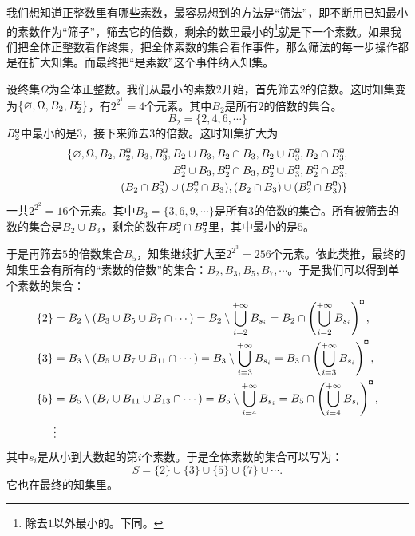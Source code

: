 \documentclass[12pt,UTF8,fontset=none]{ctexbook}
\begin{document}
\begin{ex}
    我们想知道正整数里有哪些素数，最容易想到的方法是“筛法”，即不断用已知最小的素数作为“筛子”，筛去它的倍数，剩余的数里最小的\footnote{除去$1$以外最小的。下同。}就是下一个素数。如果我们把全体正整数看作终集，把全体素数的集合看作事件，那么筛法的每一步操作都是在扩大知集。而最终把“是素数”这个事件纳入知集。

    设终集$\Omega$为全体正整数。我们从最小的素数$2$开始，首先筛去$2$的倍数。这时知集变为$\{\varnothing, \Omega, B_2, B_2^{\bu}\}$，有$2^{2^1} = 4$个元素。其中$B_2$是所有$2$的倍数的集合。
    $$B_2 = \{2,4,6,\cdots\}$$
    $B_2^{\bu}$中最小的是$3$，接下来筛去$3$的倍数。这时知集扩大为
    \begin{align*}
        \{\varnothing, \Omega, B_2, B_2^{\bu}, B_3, B_3^{\bu}, B_2\cup B_3, B_2\cap B_3, B_2\cup B_3^{\bu}, B_2\cap B_3^{\bu},\\
        B_2^{\bu}\cup B_3, B_2^{\bu}\cap B_3, B_2^{\bu}\cup B_3^{\bu}, B_2^{\bu}\cap B_3^{\bu}, \\ (B_2\cap B_3^{\bu})\cup(B_2^{\bu}\cap B_3), (B_2\cap B_3)\cup(B_2^{\bu}\cap B_3^{\bu})\}
    \end{align*}
    一共$2^{2^2} = 16$个元素。其中$B_3= \{3,6,9,\cdots\}$是所有$3$的倍数的集合。所有被筛去的数的集合是$B_2\cup B_3$，剩余的数在$B_2^{\bu}\cap B_3^{\bu}$里，其中最小的是$5$。
    
    于是再筛去$5$的倍数集合$B_5$，知集继续扩大至$2^{2^3} = 256$个元素。依此类推，最终的知集里会有所有的“素数的倍数”的集合：$B_2, B_3, B_5, B_7, \cdots$。于是我们可以得到单个素数的集合：
    \begin{align*}
        \{2\} &= B_2 \setminus \left(B_3 \cup B_5 \cup B_7\cap\cdots\right) = B_2 \setminus \bigcup_{i=2}^{+\infty} B_{s_i} = B_2 \cap \left(\bigcup_{i=2}^{+\infty} B_{s_i} \right)^{\bu}, \\
        \{3\} &= B_3 \setminus \left(B_5 \cup B_7 \cup B_{11}\cap\cdots\right) = B_3 \setminus \bigcup_{i=3}^{+\infty} B_{s_i} = B_3 \cap \left(\bigcup_{i=3}^{+\infty} B_{s_i} \right)^{\bu}, \\
        \{5\} &= B_5 \setminus \left(B_7 \cup B_{11} \cup B_{13}\cap\cdots\right) = B_5 \setminus \bigcup_{i=4}^{+\infty} B_{s_i} = B_5 \cap \left(\bigcup_{i=4}^{+\infty} B_{s_i} \right)^{\bu}, \\
        &\vdots
    \end{align*}
    其中$s_i$是从小到大数起的第$i$个素数。于是全体素数的集合可以写为：
    $$ S = \{2\}\cup \{3\} \cup \{5\}\cup \{7\}\cup\cdots .$$
    它也在最终的知集里。
\end{ex}
\end{document}
